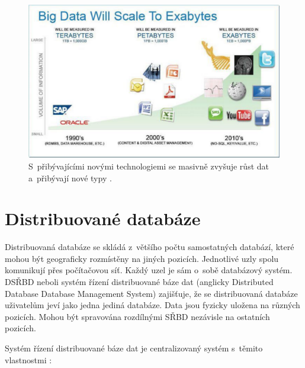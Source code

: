\begin{figure}[!h]
  \centering
  \includegraphics[width=15cm]{template-fig/big_data_exabytes.pdf}
  \caption{S~přibývajícími novými technologiemi se masivně zvyšuje růst dat a~přibývají nové typy \cite{rajeshBigData}.}
  \label{FIG_BigDataExabytes}
\end{figure}


\section{Distribuované databáze}
Distribuovaná databáze se skládá z~většího počtu samostatných databází, které mohou být geograficky rozmístěny na jiných pozicích. Jednotlivé uzly spolu komunikují přes počítačovou síť. Každý uzel je sám o~sobě databázový systém. DSŘBD neboli systém řízení distribuované báze dat (anglicky Distributed Database Database Management System) zajišťuje, že se distribuovaná databáze uživatelům jeví jako jedna jediná databáze. Data jsou fyzicky uložena na různých pozicích. Mohou být spravována rozdílnými SŘBD nezávisle na ostatních pozicích.

\vspace{0.5cm}

\noindent Systém řízení distribuované báze dat je centralizovaný systém s~těmito vlastnostmi 
\cite{distributedDBMS}:

